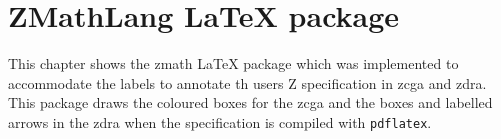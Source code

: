 
\chapter{ZMathLang \LaTeX{} package}
\label{app:zmathlatex}

This chapter shows the \gls{zmath} \LaTeX{} package which was implemented to
accommodate the labels to annotate th users Z specification in \gls{zcga} 
and \gls{zdra}. This package draws the coloured boxes for the \gls{zcga} 
and the boxes and labelled arrows in the \gls{zdra} when the specification 
is compiled with \texttt{pdflatex}.

